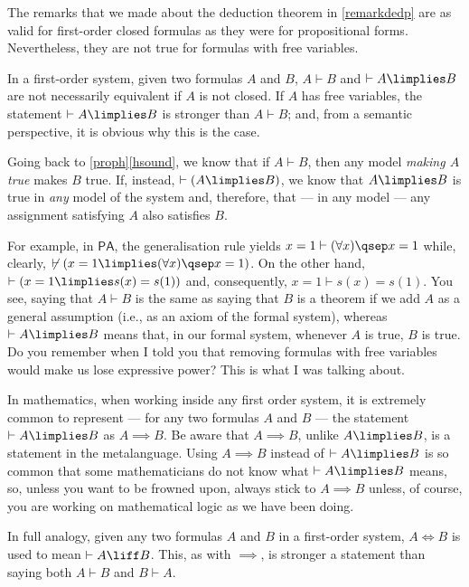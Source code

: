 \begin{para}
The remarks that we made about the deduction theorem in \ref{remarkdedp} are as valid for first-order closed formulas as they were for propositional forms. Nevertheless, they are not true for formulas with free variables.

In a first-order system, given two formulas $A$ and $B$, $A\vdash B$ and $\vdash A\limplies B$ are not necessarily equivalent if $A$ is not closed.
If $A$ has free variables, the statement $\vdash A \limplies B$ is stronger than $A \vdash B$; and, from a semantic perspective, it is obvious why this is the case.

Going back to \ref{proph}\ref{hsound}, we know that if $A\vdash B$, then any model \emph{making $A$ true} makes $B$ true.
If, instead, $\vdash (A\limplies B)$, we know that $A\limplies B$ is true in \emph{any} model of the system and, therefore, that --- in any model --- any assignment satisfying $A$ also satisfies $B$.

For example, in $\mathsf{PA}$, the generalisation rule yields $x = 1 \vdash (\forall x)\qsep x = 1$ while, clearly, $\not\vdash (x = 1 \limplies (\forall x)\qsep x = 1)$. On the other hand, $\vdash (x = 1 \limplies s(x)  = s(1))$ and, consequently, $x = 1 \vdash s(x) = s(1)$.
You see, saying that $A \vdash B$ is the same as saying that $B$ is a theorem if we add $A$ as a general assumption (i.e., as an axiom of the formal system), whereas $\vdash A \limplies B$ means that, in our formal system, whenever $A$ is true, $B$ is true.
Do you remember when I told you that removing formulas with free variables would make us lose expressive power? This is what I was talking about. 

In mathematics, when working inside any first order system, it is extremely common to represent --- for any two formulas $A$ and $B$ --- the statement $\vdash A\limplies B$ as $A\implies B$.
Be aware that $A\implies B$, unlike $A\limplies B$, is a statement in the metalanguage.
Using $A\implies B$ instead of $\vdash A\limplies B$ is so common that some mathematicians do not know what $\vdash A \limplies B$ means, so, unless you want to be frowned upon, always stick to $A\implies B$ unless, of course, you are working on mathematical logic as we have been doing.

In full analogy, given any two formulas $A$ and $B$ in a first-order system, $A\iff B$ is used to mean $\vdash A\liff B$. This, as with $\implies$, is stronger a statement than saying both $A\vdash B$ and $B\vdash A$.
\end{para}

